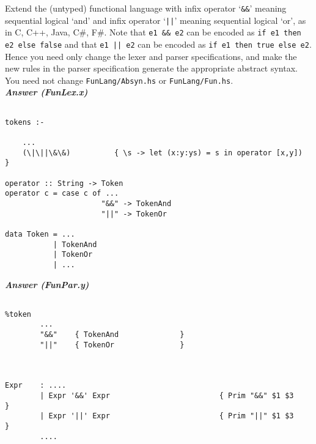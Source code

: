 \documentclass[a4paper]{article}
\begin{document}
\begin{exercise}\label{exer-fun-sequential-logical}
  Extend the (untyped) functional language with infix operator
  `\verb|&&|' meaning sequential logical `and' and infix operator
  `\verb+||+' meaning sequential logical `or', as in C, C++, Java,
  C\#, F\#\@.  Note that \verb+e1 && e2+ can be encoded as \texttt{if
    e1 then e2 else false} and that \verb+e1 || e2+ can be encoded as
  \texttt{if e1 then true else e2}.  Hence you need only change the
  lexer and parser specifications, and make the new rules in the
  parser specification generate the appropriate abstract syntax.  You
  need not change \texttt{FunLang/Absyn.hs} or \texttt{FunLang/Fun.hs}\@.\\
  
  
\noindent
\textbf{\emph{Answer (FunLex.x)}} 
{\codesetup\begin{verbatim}

tokens :-

    ...
    (\|\||\&\&)          { \s -> let (x:y:ys) = s in operator [x,y])  }

operator :: String -> Token
operator c = case c of ... 
                      "&&" -> TokenAnd
                      "||" -> TokenOr
                      
data Token = ...
           | TokenAnd
           | TokenOr
           | ...
\end{verbatim}}

\noindent
\textbf{\emph{Answer (FunPar.y)}} 
{\codesetup\begin{verbatim}

%token  
        ...    
        "&&"    { TokenAnd              }
        "||"    { TokenOr               }



Expr    : ....
        | Expr '&&' Expr                         { Prim "&&" $1 $3        }
        | Expr '||' Expr                         { Prim "||" $1 $3        }
        ....
\end{verbatim}}

\end{exercise}
\end{document}
